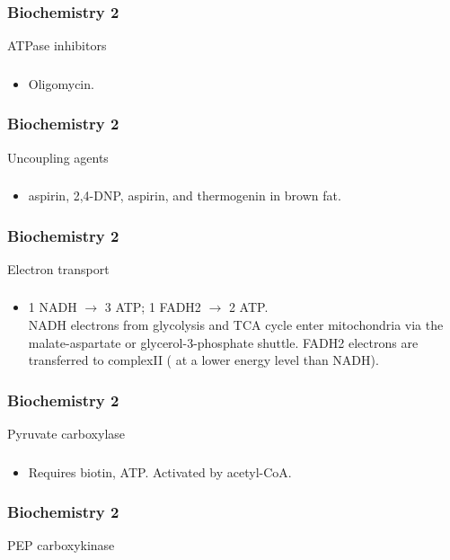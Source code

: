 \documentclass[11pt]{beamer}
\begin{document}
\begin{frame}
 \frametitle{Biochemistry 2}
ATPase inhibitors
\end{frame}

\begin{frame}
 \frametitle{}
\begin{itemize}
\item Oligomycin.
\end{itemize}
\end{frame}

\begin{frame}
 \frametitle{Biochemistry 2}
Uncoupling agents
\end{frame}

\begin{frame}
 \frametitle{}
\begin{itemize}
\item aspirin, 2,4-DNP, aspirin, and thermogenin in brown fat.
\end{itemize}
\end{frame}

\begin{frame}
 \frametitle{Biochemistry 2}
Electron transport
\end{frame}

\begin{frame}
 \frametitle{}
\begin{itemize}
\item 1 NADH ${\rightarrow}$ 3 ATP; 1 FADH2 ${\rightarrow}$ 2 ATP. \\ NADH electrons from glycolysis and TCA cycle enter mitochondria via the malate-aspartate or glycerol-3-phosphate shuttle. FADH2 electrons are transferred to complexII ( at a lower energy level than NADH). 
\end{itemize}
\end{frame}

\begin{frame}
 \frametitle{Biochemistry 2}
Pyruvate carboxylase
\end{frame}

\begin{frame}
 \frametitle{}
\begin{itemize}
\item Requires biotin, ATP. Activated by acetyl-CoA.
\end{itemize}
\end{frame}

\begin{frame}
 \frametitle{Biochemistry 2}
PEP carboxykinase
\end{frame}
\end{document}
